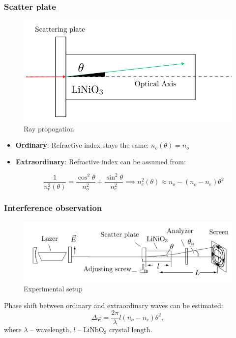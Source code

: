 \documentclass{beamer}
\begin{document}
		
	\begin{frame}
		\frametitle{Scatter plate}		
		\begin{figure}
			\footnotesize
			\centering
			\includegraphics[width=0.9\linewidth]{res/theta_propagation}
			\vspace{-5pt}
			\footnotesize
			\caption{\footnotesize Ray propogation}
		\end{figure}
		
		\footnotesize
		\begin{itemize}
			\item[] \textbf{Ordinary}: Refractive index stays the same: $n_o(\theta) = n_o$
			
			\item[] \textbf{Extraordinary}: Refractive index can be assumed from:
			
			$$\frac{1}{n_e^2(\theta)} = \frac{\cos^2{\theta}}{n_o^2} + \frac{\sin^2{\theta}}{n_e^2} \implies n_e^2(\theta) \approx n_o - (n_o - n_e) \theta^2$$
		\end{itemize}	
	\end{frame}
	
	\begin{frame}
		\frametitle{Interference observation}
		
		\begin{figure}
			\centering
			\includegraphics[width=1\linewidth]{res/scheme}
			\caption{Experimental setup}
		\end{figure}
		
		Phase shift between ordinary and extraordinary waves can be estimated:
		$$
		\Delta \varphi = \frac{2\pi}{\lambda}l(n_o - n_e)\theta^2,
		$$
		where $\lambda$ -- wavelength, $l$ -- LiNbO$_3$ crystal length.
	\end{frame}
\end{document}
